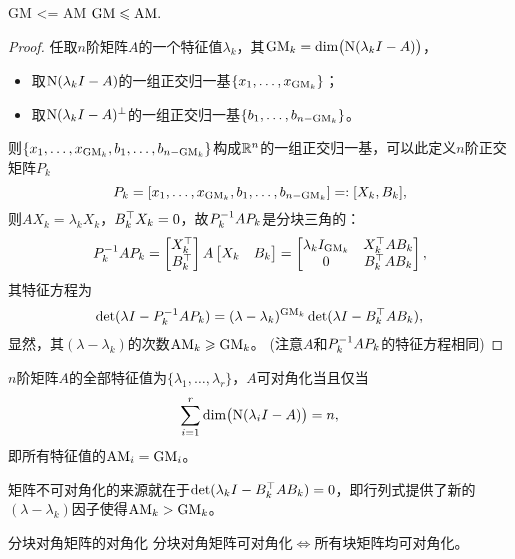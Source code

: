 \begin{theorem}{}{GM <= AM}
	$\mathrm{GM}\leqslant\mathrm{AM}.$
\end{theorem}
\begin{proof}
	任取$n$阶矩阵$A$的一个特征值$\lambda_k$，其$\mathrm{GM}_k=\dim\bigl(\operatorname{N}(\lambda_kI-A)\bigr)$，
	\begin{itemize}
		\item 取$\operatorname{N}(\lambda_kI-A)$的一组正交归一基$\{x_1,\ldots,x_{\mathrm{GM}_k}\}$；
		\item 取$\operatorname{N}(\lambda_kI-A)^\perp$的一组正交归一基$\{b_1,\ldots,b_{n-\mathrm{GM}_k}\}$。
	\end{itemize}
	则$\{x_1,\ldots,x_{\mathrm{GM}_k},b_1,\ldots,b_{n-\mathrm{GM}_k}\}$构成$\mathbb R^n$的一组正交归一基，可以此定义$n$阶正交矩阵$P_k$ 
	\[
		P_k=[x_1,\ldots,x_{\mathrm{GM}_k},b_1,\ldots,b_{n-\mathrm{GM}_k}]=:[X_k,B_k],
	\]
	则$AX_k=\lambda_kX_k$，$B_k^\top X_k=0$，故$P_k^{-1} AP_k$是分块三角的：
	\[
		P_k^{-1} AP_k=\begin{bmatrix}
			X_k^\top\\B_k^\top
		\end{bmatrix}A\begin{bmatrix}
			X_k&B_k
		\end{bmatrix}=\begin{bmatrix}
			\lambda_kI_{\mathrm{GM}_k}&X_k^\top AB_k\\0&B_k^\top AB_k
		\end{bmatrix},
	\]
	其特征方程为
	\[
		\det(\lambda I-P_k^{-1} AP_k)=(\lambda-\lambda_k)^{\mathrm{GM}_k}\det(\lambda I-B_k^\top AB_k),
	\]
	显然，其$(\lambda-\lambda_k)$的次数$\mathrm{AM}_k\geqslant\mathrm{GM}_k$。
	(注意$A$和$P_k^{-1} AP_k$的特征方程相同)
\end{proof}

\begin{corollary}
	$n$阶矩阵$A$的全部特征值为$\{\lambda_1,\ldots,\lambda_r\}$，$A$可对角化当且仅当
	\[
		\sum_{i=1}^r\dim\bigl(\operatorname{N}(\lambda_iI-A)\bigr)=n,
	\]
	即所有特征值的$\mathrm{AM}_i=\mathrm{GM}_i$。
\end{corollary}

\begin{corollary}
	矩阵不可对角化的来源就在于$\det(\lambda_kI-B_k^\top AB_k)=0$，即行列式提供了新的$(\lambda-\lambda_k)$因子使得$\mathrm{AM}_k>\mathrm{GM}_k$。
\end{corollary}

\begin{theorem}
	{分块对角矩阵的对角化}{}
	分块对角矩阵可对角化$\iff$所有块矩阵均可对角化。
\end{theorem}

